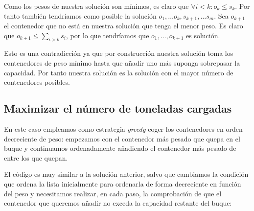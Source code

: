 Como los pesos de nuestra solución son mínimos, es claro que $\forall i < k: o_k \leq s_k$.
Por tanto también tendríamos como posible la solución $o_1, \dots o_k, s_{k+1}, \dots s_m$.
Sea $o_{k+1}$ el contenedor que no está en nuestra solución que tenga el menor peso.
Es claro que $o_{k+1} \leq \sum_{i > k} s_i$, por lo que tendríamos que
$o_1, \dots, o_{k+1}$ es solución.

Esto es una contradicción ya que por construcción nuestra solución toma los contenedores
de peso mínimo hasta que añadir uno más suponga sobrepasar la capacidad. Por tanto nuestra
solución es la solución con el mayor número de contenedores posibles.

\subsection{Maximizar el número de toneladas cargadas}

En este caso empleamos como estrategia \textit{greedy} coger los contenedores en orden
decreciente de peso: empezamos con el contenedor más pesado que quepa en el buque
y continuamos ordenadamente añadiendo el contenedor más pesado de entre los que quepan.

El código es muy similar a la solución anterior, salvo que cambiamos la condición
que ordena la lista inicialmente para ordenarla de forma decreciente en función del peso
y necesitamos realizar, en cada paso, la comprobación de que el contenedor que
queremos añadir no exceda la capacidad restante del buque:




